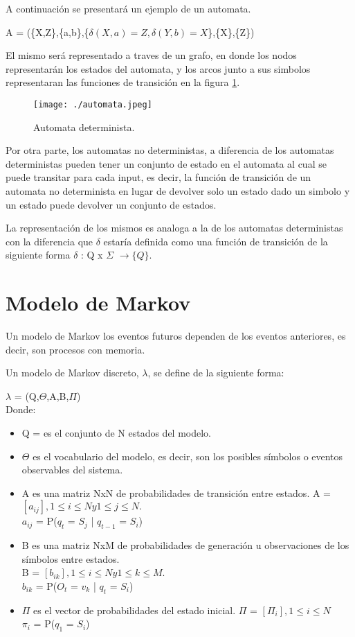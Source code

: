 A continuaci\'on se presentar\'a un ejemplo de un automata.

A = (\{X,Z\},\{a,b\},\{$\delta(X,a)=Z,\delta(Y,b)=X$\},\{X\},\{Z\})

 El mismo ser\'a representado a traves de un grafo, en donde los nodos representar\'an los estados del automata, y los arcos junto a sus simbolos representaran las funciones de transici\'on en la figura \ref{fig:automata}.

\begin{figure}
\texttt{[image: ./automata.jpeg]}
\caption{Automata determinista.}
\label{fig:automata}
\end{figure}

Por otra parte, los automatas no deterministas, a diferencia de los automatas deterministas pueden tener un conjunto de estado en el automata al cual se puede transitar para cada input, es decir, la funci\'on de transici\'on de un automata no determinista en lugar de devolver solo un estado dado un simbolo y un estado puede devolver un conjunto de estados.

La representaci\'on de los mismos es analoga a la de los automatas deterministas con la diferencia que $\delta$ estar\'ia definida como una funci\'on de transici\'on de la siguiente forma $\delta$ : Q x $\Sigma$ $\rightarrow \{Q\}.$

\section{Modelo de Markov}

Un modelo de Markov los eventos futuros dependen de los eventos anteriores, es decir, son procesos con memoria.

Un modelo de Markov discreto, $\lambda$, se define de la siguiente forma:

$\lambda$ = (Q,$\Theta$,A,B,$\Pi$)\\

Donde: 

\begin{itemize}
\item Q = {} es el conjunto de N estados del modelo.
\item $\Theta$ es el vocabulario del modelo, es decir, son los posibles s\'imbolos o eventos observables del sistema.
\item A es una matriz NxN de probabilidades de transici\'on entre estados.
A = $[a_{ij}], 1\leq i \leq N  y  1\leq j \leq N.$\\
$a_{ij}$ = P($q_{t}$ = $S_{j}$ | $q_{t-1}$ = $S_{i}$)
\item B es una matriz NxM de probabilidades de generaci\'on u observaciones de los s\'imbolos entre estados.\\
B = $[b_{ik}], 1\leq i \leq N  y  1\leq k \leq M.$\\
$b_{ik}$ = P($O_{t}$ = $v_{k}$ | $q_{t}$ = $S_{i}$)
\item $\Pi$ es el vector de probabilidades del estado inicial.
$\Pi$ = $[\Pi_{i}], 1\leq i \leq N $\\
$\pi_{i}$ = P($q_{1}$ = $S_{i}$)
\end{itemize}

